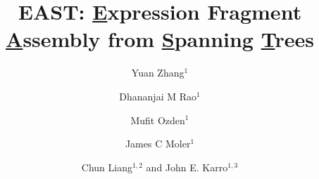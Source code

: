 \documentclass[10pt]{bmc_article}
\newenvironment{bmcformat}{\begin{raggedright}\baselineskip20pt\sloppy\setboolean{publ}{false}}{\end{raggedright}\baselineskip20pt\sloppy}
\begin{document}
\begin{bmcformat}

\title{EAST: {\underline E}xpression Fragment {\underline A}ssembly from {\underline S}panning {\underline T}rees}



\author{Yuan Zhang$^1$
  \and
  Dhananjai M Rao$^1$
  \and
  Mufit Ozden$^1$
  \and
  James C Moler$^1$
  \and
  Chun Liang\correspondingauthor$^{1,2}$
  and
  John E. Karro\correspondingauthor$^{1,3}$
}


\address{
    \iid(1)Department of Computer Science and Software Engineering, Miami University, Oxford OHIO, USA \\
    \iid(2)Department of Botanty, Miami University, Oxford OHIO, USA \\
    \iid(3)Department of Microbiology, Miami University, Oxford OHIO, USA
}

\maketitle




\end{bmcformat}
\end{document}
